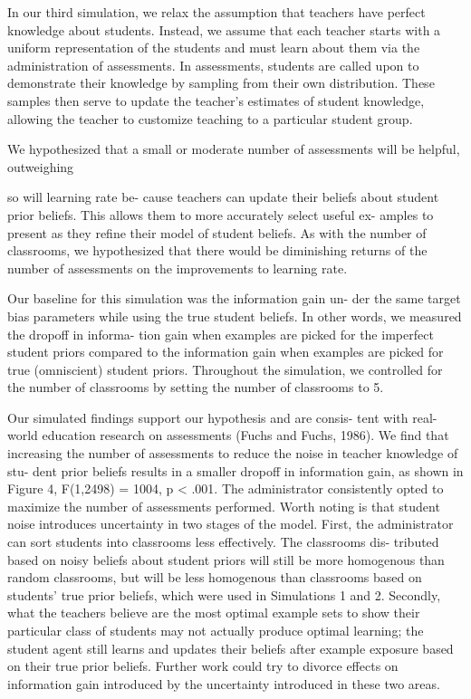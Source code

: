 \documentclass[10pt, letterpaper]{article}
\begin{document}
In our third simulation, we relax the assumption that teachers have
perfect knowledge about students. Instead, we assume that each teacher
starts with a uniform representation of the students and must learn
about them via the administration of assessments. In assessments,
students are called upon to demonstrate their knowledge by sampling from
their own distribution. These samples then serve to update the teacher's
estimates of student knowledge, allowing the teacher to customize
teaching to a particular student group.

We hypothesized that a small or moderate number of assessments will be
helpful, outweighing

so will learning rate be- cause teachers can update their beliefs about
student prior beliefs. This allows them to more accurately select useful
ex- amples to present as they refine their model of student beliefs. As
with the number of classrooms, we hypothesized that there would be
diminishing returns of the number of assessments on the improvements to
learning rate.

Our baseline for this simulation was the information gain un- der the
same target bias parameters while using the true student beliefs. In
other words, we measured the dropoff in informa- tion gain when examples
are picked for the imperfect student priors compared to the information
gain when examples are picked for true (omniscient) student priors.
Throughout the simulation, we controlled for the number of classrooms by
setting the number of classrooms to 5.

Our simulated findings support our hypothesis and are consis- tent with
real-world education research on assessments (Fuchs and Fuchs, 1986). We
find that increasing the number of assessments to reduce the noise in
teacher knowledge of stu- dent prior beliefs results in a smaller
dropoff in information gain, as shown in Figure 4, F(1,2498) = 1004, p
\textless{} .001. The administrator consistently opted to maximize the
number of assessments performed. Worth noting is that student noise
introduces uncertainty in two stages of the model. First, the
administrator can sort students into classrooms less effectively. The
classrooms dis- tributed based on noisy beliefs about student priors
will still be more homogenous than random classrooms, but will be less
homogenous than classrooms based on students' true prior beliefs, which
were used in Simulations 1 and 2. Secondly, what the teachers believe
are the most optimal example sets to show their particular class of
students may not actually produce optimal learning; the student agent
still learns and updates their beliefs after example exposure based on
their true prior beliefs. Further work could try to divorce effects on
information gain introduced by the uncertainty introduced in these two
areas.
\end{document}
